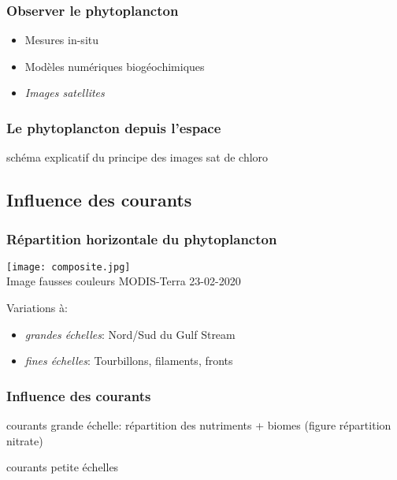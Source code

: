 \begin{frame}
  \frametitle{Observer le phytoplancton}
  {
    \centering
  }

  \begin{itemize}
    \item<2-> Mesures in-situ
    \item<3-> Modèles numériques biogéochimiques
    \item<4-> \emph{Images satellites}
  \end{itemize}
\end{frame}


\begin{frame}
  \frametitle{Le phytoplancton depuis l'espace}
  schéma explicatif du principe des images sat de chloro
\end{frame}


\subsection{Influence des courants}

\begin{frame}
  \frametitle{Répartition horizontale du phytoplancton}
  \begin{beamercolorbox}[sep=0pt, right]{}
    \texttt{[image: composite.jpg]}
    \\
    {\footnotesize Image fausses couleurs MODIS-Terra 23-02-2020}
  \end{beamercolorbox}

  \vfill

  \begin{beamercolorbox}[sep=0pt]{}
    Variations à:
    \begin{itemize}
      \item \emph{grandes échelles}: Nord/Sud du Gulf Stream
      \item<+-> \emph{fines échelles}: Tourbillons, filaments, \alert{fronts}
    \end{itemize}
  \end{beamercolorbox}
\end{frame}


\begin{frame}
  \frametitle{Influence des courants}
  courants grande échelle: répartition des nutriments + biomes (figure répartition nitrate)

  courants petite échelles
\end{frame}

